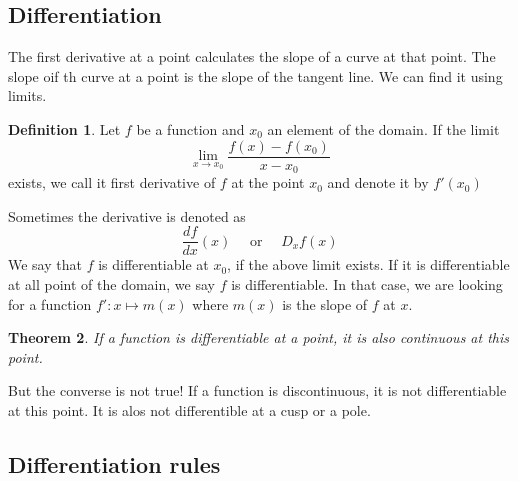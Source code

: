 \documentclass{article}
\theoremstyle{plain}
\newtheorem{theo}{Theorem}
\theoremstyle{remark}
\theoremstyle{definition}
\newtheorem{defi}[theo]{Definition}
\begin{document}
\subsection*{Differentiation}

The first derivative at a point calculates the slope of a curve at that point. The slope oif th curve at a point is the slope of the tangent line. We can find it using limits.

\begin{defi} Let $f$ be a function and $x_0$ an element of the domain. If the limit
$$\lim_{x\rightarrow x_0}\frac{f(x)-f(x_0)}{x-x_0}$$
exists, we call it first derivative of $f$ at the point $x_0$ and denote it by $f'(x_0)$\end{defi}

Sometimes the derivative is denoted as 
$$\frac{df}{dx}(x)\quad\text{ or }\quad D_xf(x)$$
We say that $f$ is differentiable at $x_0$, if the above limit exists. If it is differentiable at all point of the domain, we say $f$ is differentiable. In that case, we are looking for a function $f':x\mapsto m(x)$ where $m(x)$ is the slope of $f$ at $x$. 

\begin{theo} If a function is differentiable at a point, it is also continuous at this point.\end{theo}
But the converse is not true! If a function is discontinuous, it is not differentiable at this point. It is alos not differentible at a cusp or a pole. 

\subsection*{Differentiation rules}
\end{document}
